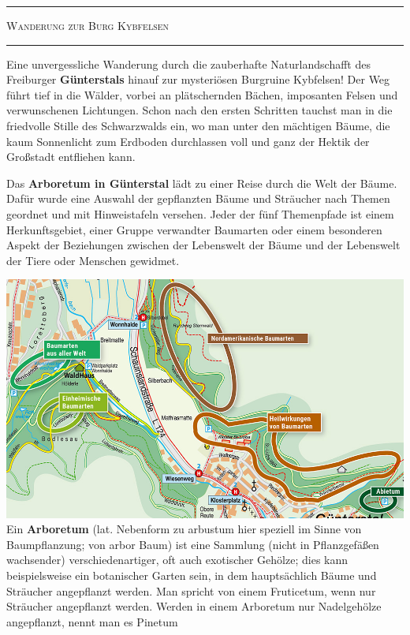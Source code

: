 \documentclass[landscape, a4paper]{article}
\newcommand\alert[1]{\textcolor{PrimaryColor}{\textbf{#1}}}
\begin{document}
\footnotesize
\begin{minipage}[t]{0.33\textwidth}
	\setlength{\parskip}{0.25cm}

	\vspace{0.5cm}

	\textcolor{PrimaryColor}{
		\rule{\linewidth}{0.5mm}
		\vspace{-0.1cm}
		\begin{center}
			\large
			\textsc{Wanderung zur Burg Kybfelsen}
		\end{center}
		\rule{\linewidth}{0.5mm}
	}
	\vspace{0.15cm}

	Eine unvergessliche Wanderung durch die zauberhafte Naturlandschafft des Freiburger \alert{Günterstals} hinauf zur mysteriösen Burgruine Kybfelsen! Der Weg führt tief in die Wälder, vorbei an plätschernden Bächen, imposanten Felsen und verwunschenen Lichtungen. Schon nach den ersten Schritten tauchst man in die friedvolle Stille des Schwarzwalds ein, wo man unter den mächtigen Bäume, die kaum Sonnenlicht zum Erdboden durchlassen voll und ganz der Hektik der Großstadt entfliehen kann.

	Das \alert{Arboretum in Günterstal} lädt zu einer Reise durch die Welt der Bäume. Dafür wurde eine Auswahl der gepflanzten Bäume und Sträucher nach Themen geordnet und mit Hinweistafeln versehen. Jeder der fünf Themenpfade ist einem Herkunftsgebiet, einer Gruppe verwandter Baumarten oder einem besonderen Aspekt der Beziehungen zwischen der Lebenswelt der Bäume und der Lebenswelt der Tiere oder Menschen gewidmet.

	\includegraphics[width=\linewidth]{./figures/arboretum.png}
	\setlength{\parskip}{0.25cm}
	\vspace{0.15cm}
	Ein \alert{Arboretum} (lat. Nebenform zu arbustum hier speziell im Sinne von Baumpflanzung; von arbor Baum) ist eine Sammlung (nicht in Pflanzgefäßen wachsender) verschiedenartiger, oft auch exotischer Gehölze; dies kann beispielsweise ein botanischer Garten sein, in dem hauptsächlich Bäume und Sträucher angepflanzt werden. Man spricht von einem Fruticetum, wenn nur Sträucher angepflanzt werden. Werden in einem Arboretum nur Nadelgehölze angepflanzt, nennt man es Pinetum
\end{minipage}
\end{document}

